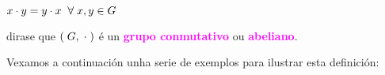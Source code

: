 \documentclass[twoside]{report}
\theoremstyle{mystyle}
\begin{document}
\vspace{2mm}

\begin{center}
    $x \cdot y = y \cdot x \hspace{2mm} \forall \hspace{1mm} x,y \in G$
\end{center}

\vspace{2mm}

\noindent dirase que $( \hspace{1mm} G, \hspace{1mm} \cdot \hspace{1mm})$ é un \textcolor{magenta}{\textbf{grupo conmutativo}} ou \textcolor{magenta}{\textbf{abeliano}}.

\vspace{5mm}

\noindent Vexamos a continuación unha serie de exemplos para ilustrar esta definición:
\end{document}
